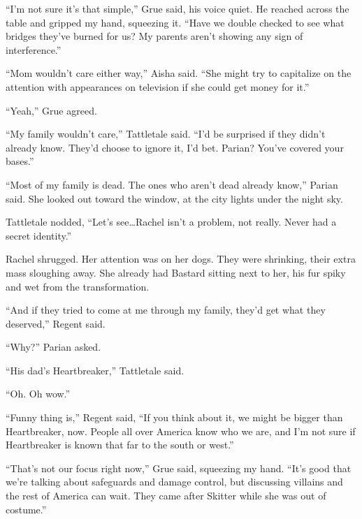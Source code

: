 ``I'm not sure it's that simple,'' Grue said, his voice quiet.  He reached across the table and gripped my hand, squeezing it.  ``Have we double checked to see what bridges they've burned for us?  My parents aren't showing any sign of interference.''



``Mom wouldn't care either way,'' Aisha said.  ``She might try to capitalize on the attention with appearances on television if she could get money for it.''



``Yeah,'' Grue agreed.



``My family wouldn't care,'' Tattletale said.  ``I'd be surprised if they didn't already know.  They'd choose to ignore it, I'd bet.  Parian?  You've covered your bases.''



``Most of my family is dead.  The ones who aren't dead already know,'' Parian said.  She looked out toward the window, at the city lights under the night sky.



Tattletale nodded, ``Let's see\ldots Rachel isn't a problem, not really.  Never had a secret identity.''



Rachel shrugged.  Her attention was on her dogs.  They were shrinking, their extra mass sloughing away.  She already had Bastard sitting next to her, his fur spiky and wet from the transformation.



``And if they tried to come at me through my family, they'd get what they deserved,'' Regent said.



``Why?'' Parian asked.



``His dad's Heartbreaker,'' Tattletale said.



``Oh.  Oh wow.''



``Funny thing is,'' Regent said, ``If you think about it, we might be bigger than Heartbreaker, now.  People all over America know who we are, and I'm not sure if Heartbreaker is known that far to the south or west.''



``That's not our focus right now,'' Grue said, squeezing my hand.  ``It's good that we're talking about safeguards and damage control, but discussing villains and the rest of America can wait.  They came after Skitter while she was out of costume.''



